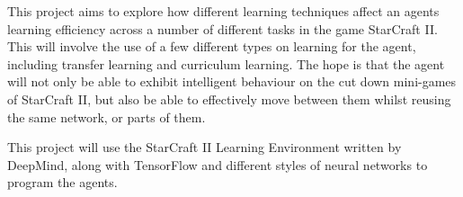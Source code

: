 This project aims to explore how different learning techniques affect an agents
learning efficiency across a number of different tasks in the game StarCraft II\@.
This will involve the use of a few different types on learning for the agent,
including transfer learning and curriculum learning. The hope is that the
agent will not only be able to exhibit intelligent behaviour on the cut down
mini-games of StarCraft II, but also be able to effectively move between them
whilst reusing the same network, or parts of them.

This project will use the StarCraft II Learning Environment written by DeepMind,
along with TensorFlow and different styles of neural networks to program the agents.
